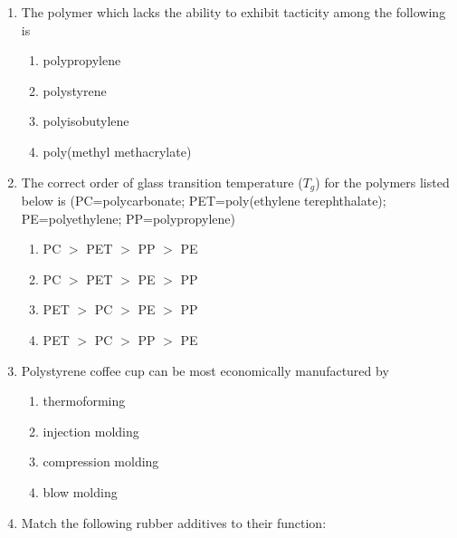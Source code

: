 \documentclass[journal,12pt,onecolumn]{IEEEtran}
\begin{document}
\begin{enumerate}[label=\arabic*)]
\item The polymer which lacks the ability to exhibit tacticity among the following is
\hfill{} \\

\vspace{0.2cm}
\begin{enumerate}[label=\alph*)]
\item polypropylene
\item polystyrene
\item polyisobutylene
\item poly(methyl methacrylate)
\end{enumerate}

\vspace{0.5cm}

\item The correct order of glass transition temperature ($T_g$) for the polymers listed below is (PC=polycarbonate; PET=poly(ethylene terephthalate); PE=polyethylene; PP=polypropylene)
\hfill{} \\

\vspace{0.2cm}
\begin{enumerate}[label=\alph*)]
\item PC $>$ PET $>$ PP $>$ PE
\item PC $>$ PET $>$ PE $>$ PP
\item PET $>$ PC $>$ PE $>$ PP
\item PET $>$ PC $>$ PP $>$ PE
\end{enumerate}

\vspace{0.5cm}

\item Polystyrene coffee cup can be most economically manufactured by
\hfill{} \\

\vspace{0.2cm}
\begin{enumerate}[label=\alph*)]
\item thermoforming
\item injection molding
\item compression molding
\item blow molding
\end{enumerate}

\vspace{0.5cm}

\item Match the following rubber additives to their function:\\


\end{enumerate}
\end{document}
